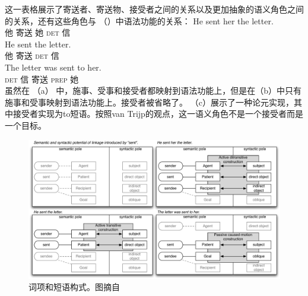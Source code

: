 这一表格展示了寄送者、寄送物、接受者之间的关系以及更加抽象的语义角色之间的关系，还有这些角色与 （）中语法功能的关系：
\eal
\ex 
\gll He sent her the letter.\\
     他 寄送 她 \textsc{det} 信\\
\ex 
\gll He sent the letter.\\
     他 寄送 \textsc{det} 信\\
\ex 
\gll The letter was sent to her.\\
      \textsc{det} 信 \passivepst{} 寄送 \textsc{prep} 她\\
\zl
虽然在 （a） 中，施事、受事和接受者都映射到语法功能上，但是在（b）中只有施事和受事映射到语法功能上。接受者被省略了。 （c）展示了一种论元实现，其中接受者实现为to短语。按照van Trijp的观点，这一语义角色不是一个接受者而是一个目标。

\begin{figure}
\includegraphics[width=\textwidth]{Figures/2011-van-Trijp.pdf}
\caption{\label{fig-as-trijp}词项和短语构式。图摘自 }
\end{figure}%


